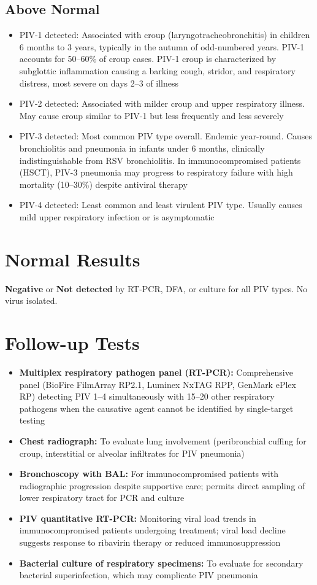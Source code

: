 \subsection*{Above Normal}
\begin{itemize}
  \item PIV-1 detected: Associated with croup (laryngotracheobronchitis) in children 6 months to 3 years, typically in the autumn of odd-numbered years. PIV-1 accounts for 50--60\% of croup cases. PIV-1 croup is characterized by subglottic inflammation causing a barking cough, stridor, and respiratory distress, most severe on days 2--3 of illness
  \item PIV-2 detected: Associated with milder croup and upper respiratory illness. May cause croup similar to PIV-1 but less frequently and less severely
  \item PIV-3 detected: Most common PIV type overall. Endemic year-round. Causes bronchiolitis and pneumonia in infants under 6 months, clinically indistinguishable from RSV bronchiolitis. In immunocompromised patients (HSCT), PIV-3 pneumonia may progress to respiratory failure with high mortality (10--30\%) despite antiviral therapy
  \item PIV-4 detected: Least common and least virulent PIV type. Usually causes mild upper respiratory infection or is asymptomatic
\end{itemize}

\section*{Normal Results}
\textbf{Negative} or \textbf{Not detected} by RT-PCR, DFA, or culture for all PIV types. No virus isolated.

\section*{Follow-up Tests}
\begin{itemize}
  \item \textbf{Multiplex respiratory pathogen panel (RT-PCR):} Comprehensive panel (BioFire FilmArray RP2.1, Luminex NxTAG RPP, GenMark ePlex RP) detecting PIV 1--4 simultaneously with 15--20 other respiratory pathogens when the causative agent cannot be identified by single-target testing
  \item \textbf{Chest radiograph:} To evaluate lung involvement (peribronchial cuffing for croup, interstitial or alveolar infiltrates for PIV pneumonia)
  \item \textbf{Bronchoscopy with BAL:} For immunocompromised patients with radiographic progression despite supportive care; permits direct sampling of lower respiratory tract for PCR and culture
  \item \textbf{PIV quantitative RT-PCR:} Monitoring viral load trends in immunocompromised patients undergoing treatment; viral load decline suggests response to ribavirin therapy or reduced immunosuppression
  \item \textbf{Bacterial culture of respiratory specimens:} To evaluate for secondary bacterial superinfection, which may complicate PIV pneumonia
\end{itemize}

